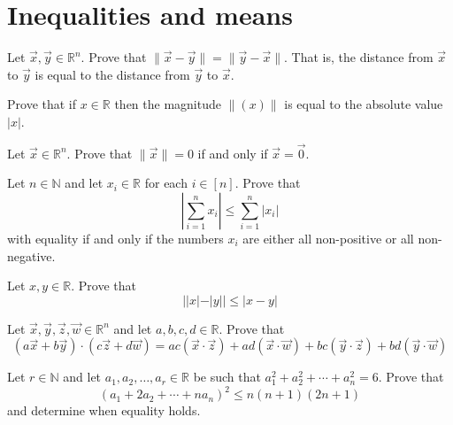 \section{Inequalities and means}


\begin{exercise}
\label{exDistanceIsSymmetric}
Let $\vec x, \vec y \in \mathbb{R}^n$. Prove that $\lVert \vec x - \vec y \rVert = \lVert \vec y - \vec x \rVert$. That is, the distance from $\vec x$ to $\vec y$ is equal to the distance from $\vec y$ to $\vec x$.
\end{exercise}

\begin{exercise}
Prove that if $x \in \mathbb{R}$ then the magnitude $\lVert (x) \rVert$ is equal to the absolute value $|x|$.
\end{exercise}

\begin{exercise}
\label{exVectorZeroIffMagnitudeZero}
Let $\vec x \in \mathbb{R}^n$. Prove that $\lVert \vec x \rVert = 0$ if and only if $\vec x = \vec 0$.
\end{exercise}

\begin{exercise}
Let $n \in \mathbb{N}$ and let $x_i \in \mathbb{R}$ for each $i \in [n]$. Prove that
\[ \left| \sum_{i=1}^n x_i \right| \le \sum_{i=1}^n |x_i| \]
with equality if and only if the numbers $x_i$ are either all non-positive or all non-negative.
\end{exercise}

\begin{exercise}
Let $x,y \in \mathbb{R}$. Prove that
\[ ||x|-|y|| \le |x-y| \]
\end{exercise}


\begin{exercise}
\label{exScalarProductIsBilinear}
Let $\vec x, \vec y, \vec z, \vec w \in \mathbb{R}^n$ and let $a,b,c,d \in \mathbb{R}$. Prove that
\[ (a \vec x + b \vec y) \cdot (c \vec z + d \vec w) = ac (\vec x \cdot \vec z) + ad (\vec x \cdot \vec w) + bc( \vec y \cdot \vec z) + bd (\vec y \cdot \vec w) \]
\end{exercise}


\begin{exercise}
Let $r \in \mathbb{N}$ and let $a_1,a_2,\dots,a_r \in \mathbb{R}$ be such that $a_1^2+a_2^2+\cdots+a_n^2=6$. Prove that
\[ (a_1+2a_2+\cdots+na_n)^2 \le n(n+1)(2n+1) \]
and determine when equality holds.
\end{exercise}



